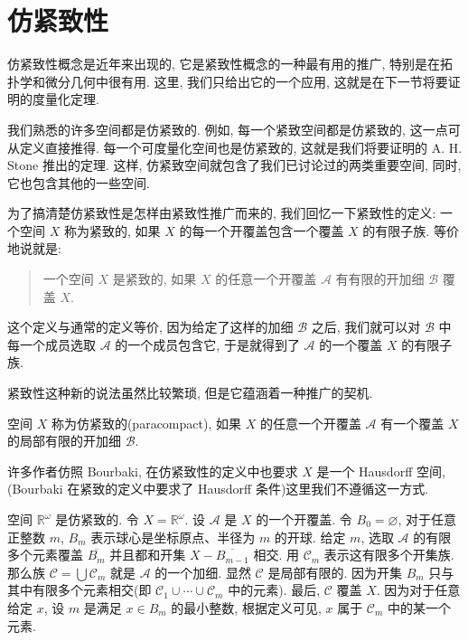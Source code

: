 \documentclass[../../main.tex]{subfiles}
\begin{document}
\section{仿紧致性}\label{section:ch06-paracompactness}

仿紧致性概念是近年来出现的, 它是紧致性概念的一种最有用的推广, 特别是在拓扑学和微分几何中很有用. 这里, 我们只给出它的一个应用, 这就是在下一节将要证明的度量化定理.

我们熟悉的许多空间都是仿紧致的. 例如, 每一个紧致空间都是仿紧致的, 这一点可从定义直接推得. 每一个可度量化空间也是仿紧致的, 这就是我们将要证明的 A. H. Stone 推出的定理. 这样, 仿紧致空间就包含了我们已讨论过的两类重要空间, 同时, 它也包含其他的一些空间.

为了搞清楚仿紧致性是怎样由紧致性推广而来的, 我们回忆一下紧致性的定义: 一个空间 $X$ 称为紧致的, 如果 $X$ 的每一个开覆盖包含一个覆盖 $X$ 的有限子族. 等价地说就是:

\begin{quote}
一个空间 $X$ 是紧致的, 如果 $X$ 的任意一个开覆盖 $\mathcal{A}$ 有有限的开加细 $\mathcal{B}$ 覆盖 $X$.
\end{quote}

这个定义与通常的定义等价, 因为给定了这样的加细 $\mathcal{B}$ 之后, 我们就可以对 $\mathcal{B}$ 中每一个成员选取 $\mathcal{A}$ 的一个成员包含它, 于是就得到了 $\mathcal{A}$ 的一个覆盖 $X$ 的有限子族.

紧致性这种新的说法虽然比较繁琐, 但是它蕴涵着一种推广的契机.

\begin{definition}\label{definition:ch06-paracompact}
空间 $X$ 称为仿紧致的(paracompact), 如果 $X$ 的任意一个开覆盖 $\mathcal{A}$ 有一个覆盖 $X$ 的局部有限的开加细 $\mathcal{B}$.
\end{definition}

许多作者仿照 Bourbaki, 在仿紧致性的定义中也要求 $X$ 是一个 Hausdorff 空间, (Bourbaki 在紧致的定义中要求了 Hausdorff 条件)这里我们不遵循这一方式.

\begin{examples}
空间 $\mathbb{R}^\omega$ 是仿紧致的. 令 $X=\mathbb{R}^\omega$. 设 $\mathcal{A}$ 是 $X$ 的一个开覆盖. 令 $B_0=\varnothing$, 对于任意正整数 $m$, $B_m$ 表示球心是坐标原点、半径为 $m$ 的开球. 给定 $m$, 选取 $\mathcal{A}$ 的有限多个元素覆盖 $\overline{B_m}$ 并且都和开集 $X-\overline{B_{m-1}}$ 相交. 用 $\mathcal{C}_m$ 表示这有限多个开集族. 那么族 $\mathcal{C}=\bigcup\mathcal{C}_m$ 就是 $\mathcal{A}$ 的一个加细. 显然 $\mathcal{C}$ 是局部有限的. 因为开集 $B_m$ 只与其中有限多个元素相交(即 $\mathcal{C}_1\cup\cdots\cup\mathcal{C}_m$ 中的元素). 最后, $\mathcal{C}$ 覆盖 $X$. 因为对于任意给定 $x$, 设 $m$ 是满足 $x\in B_m$ 的最小整数, 根据定义可见, $x$ 属于 $\mathcal{C}_m$ 中的某一个元素.
\end{examples}
\end{document}
